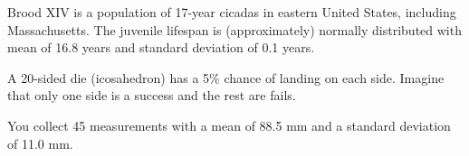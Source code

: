 \documentclass[12pt,letterpaper,addpoints]{exam}
\begin{document}
\begin{questions}
\question[10] Brood XIV is a population of 17-year cicadas in eastern United States, including Massachusetts. The juvenile lifespan is (approximately) normally distributed with mean of 16.8 years and standard deviation of 0.1 years.  

\newpage

\question[10] A 20-sided die (icosahedron) has a 5\% chance of landing on each side. Imagine that only one side is a success and the rest are fails.

\newpage

\question[10] You collect 45 measurements with a mean of 88.5 mm and a standard deviation of 11.0 mm.
\end{questions}
\end{document}
